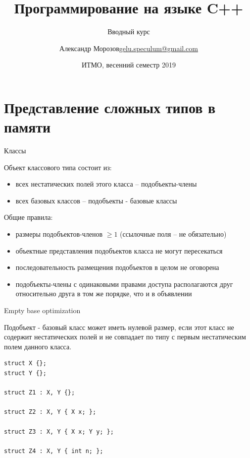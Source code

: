 \documentclass[unknownkeysallowed,xcolor=table]{beamer}
\title[C++]
{Программирование на языке C++}
\subtitle{Вводный курс}
\author[А.~Б.~Морозов]
{
  \texorpdfstring{Александр Морозов\newline\href{mailto:gelu.speculum@gmail.com}{gelu.speculum@gmail.com}}
  {Александр Морозов}
}
\date[ITMO 2019]
{ИТМО, весенний семестр 2019}
\begin{document}
\frame{\titlepage}


\section{Представление сложных типов в памяти}

\begin{frame}{Классы}

Объект классового типа состоит из:
\begin{itemize}
  \item всех нестатических полей этого класса -- подобъекты-члены
  \item всех базовых классов -- подобъекты - базовые классы
\end{itemize}

\vspace{1em}

Общие правила:
\begin{itemize}
  \item размеры подобъектов-членов $\geq 1$ (ссылочные поля -- не обязательно)
  \item объектные представления подобъектов класса не могут пересекаться
  \item последовательность размещения подобъектов в целом не оговорена
  \item подобъекты-члены с одинаковыми правами доступа располагаются друг относительно друга в том же порядке, что и в объявлении
\end{itemize}

\end{frame}

\begin{frame}[fragile]{Empty base optimization}

Подобъект - базовый класс может иметь нулевой размер, если этот класс не содержит нестатических полей и не совпадает по типу с первым нестатическим полем данного класса.

\vspace{1em}

\begin{lstlisting}
struct X {};
struct Y {};

struct Z1 : X, Y {};

struct Z2 : X, Y { X x; };

struct Z3 : X, Y { X x; Y y; };

struct Z4 : X, Y { int n; };
\end{lstlisting}

\end{frame}
\end{document}
